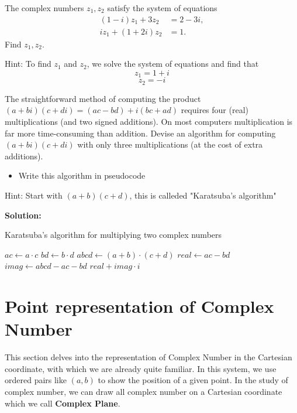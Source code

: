 \documentclass[
	12pt, %
	fleqn, %
	a4paper, %
]{LegrandOrangeBook}
\begin{document}
\begin{exercise}
    The complex numbers \( z_1, z_2 \) satisfy the system of equations
\begin{align*}
    (1 - i)z_1 + 3z_2 &= 2 - 3i, \\
    iz_1 + (1 + 2i)z_2 &= 1.
\end{align*}
Find \( z_1, z_2 \).
\end{exercise}
Hint: To find \( z_1 \) and \( z_2 \), we solve the system of equations and find that
\[ z_1 = 1 + i \]
\[ z_2 = -i \]

\begin{exercise}
    The straightforward method of computing the product \((a + bi)(c + di) = (ac - bd) + i(bc + ad)\) requires four (real) multiplications (and two signed additions). On most computers multiplication is far more time-consuming than addition. Devise an algorithm for computing \((a + bi)(c + di)\) with only three multiplications (at the cost of extra additions). 
    \begin{itemize}
        \item Write this algorithm in pseudocode
    \end{itemize}
\end{exercise}

\noindent Hint: Start with \((a + b)(c + d)\), this is calleded "Karatsuba's algorithm"

\noindent \textbf{Solution:}
\begin{algorithm}
    \caption{Karatsuba's algorithm for multiplying two complex numbers}
    \begin{algorithmic}[1]
    \State $ac \gets a \cdot c$
    \State $bd \gets b \cdot d$
    \State $abcd \gets (a + b) \cdot (c + d)$
    \State $real \gets ac - bd$
    \State $imag \gets abcd - ac - bd$
    \State \Return $real + imag \cdot i$
    \EndProcedure
    \end{algorithmic}
    \end{algorithm}

\section{Point representation of Complex Number}
This section delves into the representation of Complex Number in the Cartesian coordinate, with which we are 
already quite familiar. In this system, we use ordered pairs like $(a,b)$ to show the position of a given point.
In the study of complex number, we can draw all complex number on a Cartesian coordinate which we call \textbf{Complex Plane}.
\end{document}
